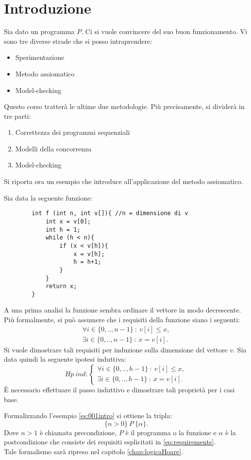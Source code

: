 
\chapter*{Introduzione}
Sia dato un programma $P$. Ci si vuole convincere del suo buon funzionamento. Vi sono tre diverse strade che si posso intraprendere:
\begin{itemize}
	\item Sperimentazione
	\item Metodo assiomatico
	\item Model-checking
\end{itemize}
Questo corso tratter\`a le ultime due metodologie. Pi\`u precisamente, si divider\`a in tre parti:
\begin{enumerate}
	\item Correttezza dei programmi sequenziali
	\item Modelli della concorrenza
	\item Model-checking
\end{enumerate}
Si riporta ora un esempio che introduce all'applicazione del metodo assiomatico.
\begin{es}
	\label{es:001intro}
	Sia data la seguente funzione:
	\begin{lstlisting}
		int f (int n, int v[]){ //n = dimensione di v
			int x = v[0];
			int h = 1;
			while (h < n){
				if (x < v[h]){
					x = v[h];
					h = h+1;
				}
			}
			return x;
		}
	\end{lstlisting}
A una prima analisi la funzione sembra ordinare il vettore in modo decrescente. Pi\`u formalmente, si pu\`o assumere che i requisiti della funzione siano i seguenti: 
	\begin{equation}
	\label{eq:requirements}
	\begin{array}{rcl}\forall i \in \{0,..,n-1\}\ :\ v[i] \leq x,\\
	\exists i \in \{0,..,n-1\}\ :\ x=v[i].\end{array}
	\end{equation}
	Si vuole dimostrare  tali requisiti per induzione sulla dimensione del vettore $v$. Sia data quindi la seguente ipotesi induttiva: 
	$$ Hp\ ind: \left\{ \begin{array}{rcl}
	 \forall i \in \{0,..,h-1\}\ :\ v[i] \leq x, \\
	\exists i \in \{0,..,h-1\}\ :\ x=v[i].
\end{array} \right. $$
	\`E necessario effettuare il passo induttivo e dimostrare tali propriet\`a per i casi base.
\end{es}

Formalizzando l'esempio \ref{es:001intro} si ottiene la tripla: $$\{n>0\}\ P\ \{\alpha\}.$$
Dove $n>1$ \`e chiamata precondizione, $P$ \`e il programma o la funzione e $\alpha$ \`e la postcondizione che consiste dei requisiti esplicitati in \eqref{eq:requirements}. \\
Tale formalismo sar\`a ripreso nel capitolo \ref{chap:logicaHoare}.